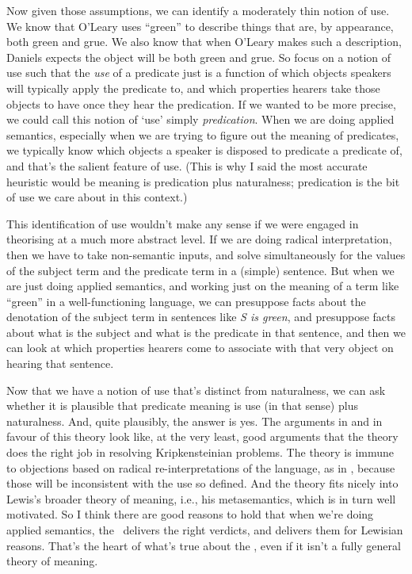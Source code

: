 Now given those assumptions, we can identify a moderately thin notion of use. We know that O'Leary uses ``green'' to describe things that are, by appearance, both green and grue. We also know that when O'Leary makes such a description, Daniels expects the object will be both green and grue. So focus on a notion of use such that the \textit{use} of a predicate just is a function of which objects speakers will typically apply the predicate to, and which properties hearers take those objects to have once they hear the predication. If we wanted to be more precise, we could call this notion of `use' simply \textit{predication}. When we are doing applied semantics, especially when we are trying to figure out the meaning of predicates, we typically know which objects a speaker is disposed to predicate a predicate of, and that's the salient feature of use. (This is why I said the most accurate heuristic would be meaning is predication plus naturalness; predication is the bit of use we care about in this context.)

This identification of use wouldn't make any sense if we were engaged in theorising at a much more abstract level. If we are doing radical interpretation, then we have to take non-semantic inputs, and solve simultaneously for the values of the subject term and the predicate term in a (simple) sentence. But when we are just doing applied semantics, and working just on the meaning of a term like ``green'' in a well-functioning language, we can presuppose facts about the denotation of the subject term in sentences like \textit{S is green}, and presuppose facts about what is the subject and what is the predicate in that sentence, and then we can look at which properties hearers come to associate with that very object on hearing that sentence.

Now that we have a notion of use that's distinct from naturalness, we can ask whether it is plausible that predicate meaning is use (in that sense) plus naturalness. And, quite plausibly, the answer is yes. The arguments in \citet{Sider2001-SIDCOP} and \citet{Weatherson2003-WEAWGA} in favour of this theory look like, at the very least, good arguments that the theory does the right job in resolving Kripkensteinian problems. The theory is immune to objections based on radical re-interpretations of the language, as in \citet{Williams2007}, because those will be inconsistent with the use so defined. And the theory fits nicely into Lewis's broader theory of meaning, i.e., his metasemantics, which is in turn well motivated. So I think there are good reasons to hold that when we're doing applied semantics, the \UNT\ delivers the right verdicts, and delivers them for Lewisian reasons. That's the heart of what's true about the \UNT, even if it isn't a fully general theory of meaning.